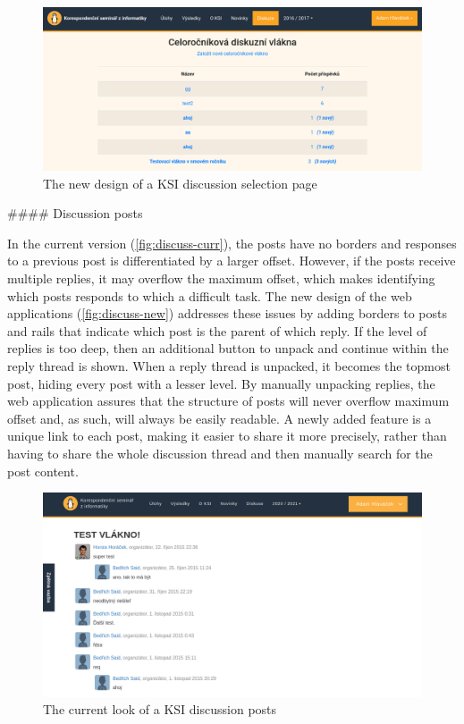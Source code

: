\documentclass[
  digital, %
  oneside, %
  lof,     %
  nolot,     %
]{fithesis4}
\begin{document}
{\begin{figure}
\includegraphics[width=\textwidth]{assets/img/discussionroot-new}
\caption{The new design of a \acrshort{KSI} discussion selection page}
\label{fig:discussroot-new}
\end{figure}

#### Discussion posts

In the current version (\autoref{fig:discuss-curr}), the posts have no borders and responses to a previous post is differentiated by a larger offset. However, if the posts receive multiple replies, it may overflow the maximum offset, which makes identifying which posts responds to which a difficult task. The new design of the web applications  (\autoref{fig:discuss-new}) addresses these issues by adding borders to posts and rails that indicate which post is the parent of which reply. If the level of replies is too deep, then an additional button to unpack and continue within the reply thread is shown. When a reply thread is unpacked, it becomes the topmost post, hiding every post with a lesser level. By manually unpacking replies, the web application assures that the structure of posts will never overflow maximum offset and, as such, will always be easily readable. A newly added feature is a unique link to each post, making it easier to share it more precisely, rather than having to share the whole discussion thread and then manually search for the post content.

\begin{figure}
\includegraphics[width=\textwidth]{assets/img/discussion-curr}
\caption{The current look of a \acrshort{KSI} discussion posts}
\label{fig:discuss-curr}
\end{figure}

}
\end{document}
